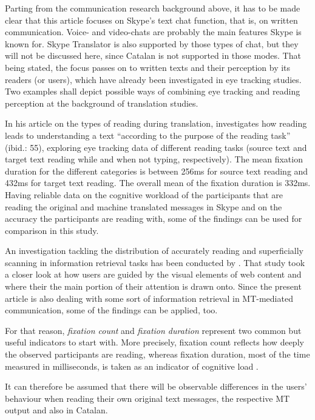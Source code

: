 \documentclass[output=paper]{langscibook}
\begin{document}
    Parting from the communication research background above, it has to be made clear that this article focuses on Skype's text chat function, that is, on written communication. Voice- and video-chats are probably the main features Skype is known for. Skype Translator is also supported by those types of chat, but they will not be discussed here, since Catalan is not supported in those modes. That being stated, the focus passes on to written texts and their perception by its readers (or users), which have already been investigated in eye tracking studies. Two examples shall depict possible ways of combining eye tracking and reading perception at the background of translation studies.
     
    In his article on the types of reading during translation, \citet[63]{jakobsen_chapter_2017} investigates how reading leads to understanding a text ``according to the purpose of the reading task'' (ibid.: 55), exploring eye tracking data of different reading tasks (source text and target text reading while and when not typing, respectively). The mean fixation duration for the different categories is between 256ms for source text reading and 432ms for target text reading. The overall mean of the fixation duration is 332ms. Having reliable data on the cognitive workload of the participants that are reading the original and machine translated messages in Skype and on the accuracy the participants are reading with, some of the findings can be used for comparison in this study.

    An investigation tackling the distribution of accurately reading and superficially scanning in information retrieval tasks has been conducted by \citet{bergstrom_chapter_2014}. That study took a closer look at how users are guided by the visual elements of web content and where their the main portion of their attention is drawn onto. Since the present article is also dealing with some sort of information retrieval in MT-mediated communication, some of the findings can be applied, too.

    For that reason, \textit{fixation count} and \textit{fixation duration} represent two common but useful indicators to start with. More precisely, fixation count reflects how deeply the observed participants are reading, whereas fixation duration, most of the time measured in milliseconds, is taken as an indicator of cognitive load \citep[cf.][63]{jakobsen_chapter_2017}.

    It can therefore be assumed that there will be observable differences in the users' behaviour when reading their own original text messages, the respective MT output and also in Catalan. 
    
\end{document}
